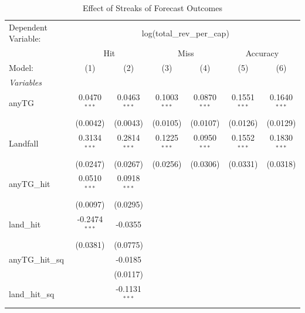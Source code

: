 \documentclass{article}
\begin{document}
\begin{table}[htbp]
   \caption{Effect of Streaks of Forecast Outcomes}
   \centering
   \begin{tabular}{lcccccc}
      \tabularnewline \midrule \midrule
      Dependent Variable: & \multicolumn{6}{c}{log(total\_rev\_per\_cap)}\\
       & \multicolumn{2}{c}{Hit} & \multicolumn{2}{c}{Miss} & \multicolumn{2}{c}{Accuracy} \\ 
      Model:                  & (1)             & (2)             & (3)             & (4)             & (5)            & (6)\\  
      \midrule
      \emph{Variables}\\
      anyTG                   & 0.0470$^{***}$  & 0.0463$^{***}$  & 0.1003$^{***}$  & 0.0870$^{***}$  & 0.1551$^{***}$ & 0.1640$^{***}$\\   
                              & (0.0042)        & (0.0043)        & (0.0105)        & (0.0107)        & (0.0126)       & (0.0129)\\   
      Landfall                & 0.3134$^{***}$  & 0.2814$^{***}$  & 0.1225$^{***}$  & 0.0950$^{***}$  & 0.1552$^{***}$ & 0.1830$^{***}$\\   
                              & (0.0247)        & (0.0267)        & (0.0256)        & (0.0306)        & (0.0331)       & (0.0318)\\   
      anyTG\_hit              & 0.0510$^{***}$  & 0.0918$^{***}$  &                 &                 &                &   \\   
                              & (0.0097)        & (0.0295)        &                 &                 &                &   \\   
      land\_hit               & -0.2474$^{***}$ & -0.0355         &                 &                 &                &   \\   
                              & (0.0381)        & (0.0775)        &                 &                 &                &   \\   
      anyTG\_hit\_sq          &                 & -0.0185         &                 &                 &                &   \\   
                              &                 & (0.0117)        &                 &                 &                &   \\   
      land\_hit\_sq           &                 & -0.1131$^{***}$ &                 &                 &                &   \\   

\end{tabular}
\end{table}
\end{document}
